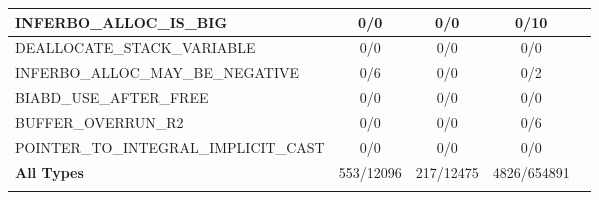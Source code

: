 \begin{table}
\begin{tabular}{!{\vrule width 1pt}l!{\vrule width 1pt}c|c|c!{\vrule width 1pt}c!{\vrule width 1pt}}
         {\scriptsize INFERBO\_ALLOC\_IS\_BIG}&  {\footnotesize 0/0}&  {\footnotesize 0/0}&  {\footnotesize 0/10}\\ \hline
         {\scriptsize DEALLOCATE\_STACK\_VARIABLE}&  {\footnotesize 0/0}&  {\footnotesize 0/0}&  {\footnotesize 0/0}\\ \hline
         {\scriptsize INFERBO\_ALLOC\_MAY\_BE\_NEGATIVE}&  {\footnotesize 0/6}&  {\footnotesize 0/0}&  {\footnotesize 0/2}\\ \hline
         {\scriptsize BIABD\_USE\_AFTER\_FREE}&  {\footnotesize 0/0}&  {\footnotesize 0/0}&  {\footnotesize 0/0}\\ \hline
         {\scriptsize BUFFER\_OVERRUN\_R2}&  {\footnotesize 0/0}&  {\footnotesize 0/0}&  {\footnotesize 0/6}\\ \hline
         {\scriptsize POINTER\_TO\_INTEGRAL\_IMPLICIT\_CAST}&  {\footnotesize 0/0}&  {\footnotesize 0/0}&  {\footnotesize 0/0}\\
         {\footnotesize \textbf{All Types}}&  {\footnotesize 553/12096}&  {\footnotesize 217/12475}&  {\footnotesize 4826/654891}\\
    \end{tabular}
    \label{tab:d2a-bug-types2}
\end{table}


